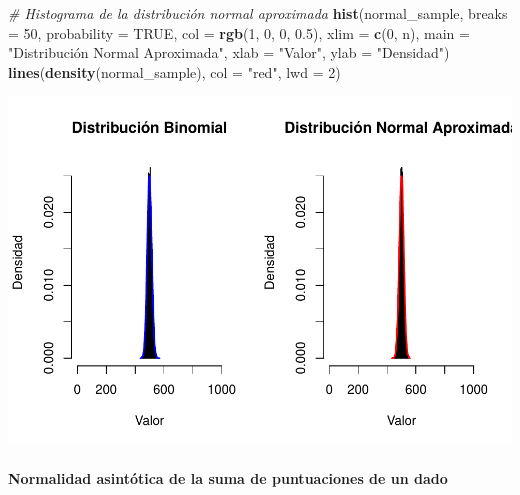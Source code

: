 \documentclass[
]{article}
\newenvironment{Shaded}{\begin{snugshade}}{\end{snugshade}}
\newcommand{\AttributeTok}[1]{\textcolor[rgb]{0.13,0.29,0.53}{#1}}
\newcommand{\CommentTok}[1]{\textcolor[rgb]{0.56,0.35,0.01}{\textit{#1}}}
\newcommand{\ConstantTok}[1]{\textcolor[rgb]{0.56,0.35,0.01}{#1}}
\newcommand{\DecValTok}[1]{\textcolor[rgb]{0.00,0.00,0.81}{#1}}
\newcommand{\FloatTok}[1]{\textcolor[rgb]{0.00,0.00,0.81}{#1}}
\newcommand{\FunctionTok}[1]{\textcolor[rgb]{0.13,0.29,0.53}{\textbf{#1}}}
\newcommand{\NormalTok}[1]{#1}
\newcommand{\StringTok}[1]{\textcolor[rgb]{0.31,0.60,0.02}{#1}}
\begin{document}
\begin{Shaded}
\begin{Highlighting}[]
\CommentTok{\# Histograma de la distribución normal aproximada}
\FunctionTok{hist}\NormalTok{(normal\_sample, }\AttributeTok{breaks =} \DecValTok{50}\NormalTok{, }\AttributeTok{probability =} \ConstantTok{TRUE}\NormalTok{, }
     \AttributeTok{col =} \FunctionTok{rgb}\NormalTok{(}\DecValTok{1}\NormalTok{, }\DecValTok{0}\NormalTok{, }\DecValTok{0}\NormalTok{, }\FloatTok{0.5}\NormalTok{), }\AttributeTok{xlim =} \FunctionTok{c}\NormalTok{(}\DecValTok{0}\NormalTok{, n), }
     \AttributeTok{main =} \StringTok{"Distribución Normal Aproximada"}\NormalTok{, }\AttributeTok{xlab =} \StringTok{"Valor"}\NormalTok{, }
     \AttributeTok{ylab =} \StringTok{"Densidad"}\NormalTok{)}
\FunctionTok{lines}\NormalTok{(}\FunctionTok{density}\NormalTok{(normal\_sample), }\AttributeTok{col =} \StringTok{"red"}\NormalTok{, }\AttributeTok{lwd =} \DecValTok{2}\NormalTok{)}
\end{Highlighting}
\end{Shaded}

\includegraphics{_main_files/figure-latex/unnamed-chunk-14-1.pdf}

\paragraph{Normalidad asintótica de la suma de puntuaciones de un dado}\label{normalidad-asintuxf3tica-de-la-suma-de-puntuaciones-de-un-dado}
\end{document}
